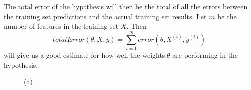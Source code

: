 \documentclass{book}[a5paper]
\begin{document}

The total error of the hypothesis will then be the total of all the errors between the training set predictions and the actual training set results. Let $m$ be the number of features in the training set $X$. Then
\begin{equation}
totalError(\theta, X, y) = \sum_{i=1}^m error(\theta, X^{(i)}, y^{(i)})
\end{equation}
will give us a good estimate for how well the weights $\theta$ are performing in the hypothesis.

\begin{figure}[!htp]
    \centering
    \pgfplotsset{ticks=none}
    \begin{minipage}{.3\textwidth}
        \centering
        (a)
    \end{minipage}
    \begin{minipage}{.3\textwidth}
        \centering
        \resizebox{\textwidth}{!}{
            \begin{tikzpicture}


\end{tikzpicture}}
\end{minipage}
\end{figure}
\end{document}
